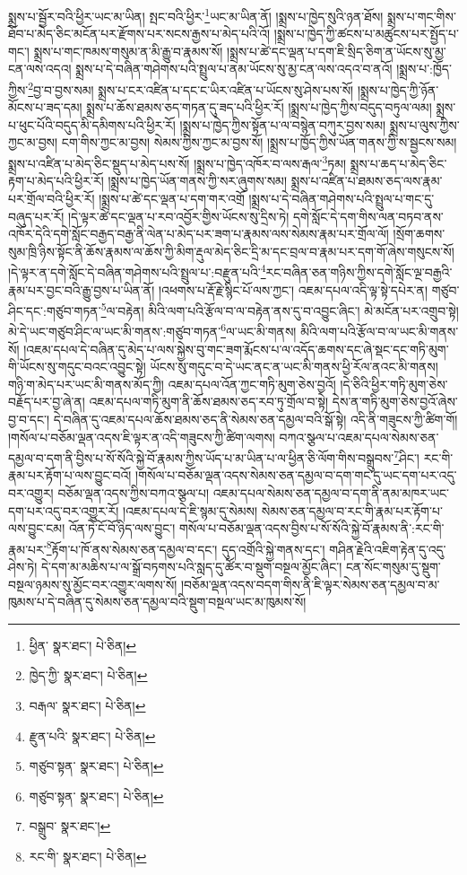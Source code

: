 སྨྲས་པ་སྦྱོར་བའི་ཕྱིར་ཡང་མ་ཡིན། སྤང་བའི་ཕྱིར་\footnote{ཕྱིན་  སྣར་ཐང་།  པེ་ཅིན། }ཡང་མ་ཡིན་ནོ། །སྨྲས་པ་ཁྱེད་སུའི་ཉན་ཐོས། སྨྲས་པ་གང་གིས་ཐོབ་པ་མེད་ཅིང་མངོན་པར་རྫོགས་པར་སངས་རྒྱས་པ་མེད་པའི་འོ། །སྨྲས་པ་ཁྱེད་ཀྱི་ཚངས་པ་མཚུངས་པར་སྤྱོད་པ་གང་། སྨྲས་པ་གང་ཁམས་གསུམ་ན་མི་རྒྱུ་བ་རྣམས་སོ། །སྨྲས་པ་ཚེ་དང་ལྡན་པ་དག་ཇི་སྲིད་ཅིག་ན་ཡོངས་སུ་མྱ་ངན་ལས་འདའ། སྨྲས་པ་དེ་བཞིན་གཤེགས་པའི་སྤྲུལ་པ་ནམ་ཡོངས་སུ་མྱ་ངན་ལས་འདའ་བ་ནའོ། །སྨྲས་པ་:ཁྱོད་ཀྱིས་\footnote{ཁྱེད་ཀྱི་  སྣར་ཐང་།  པེ་ཅིན། }བྱ་བ་བྱས་སམ། སྨྲས་པ་ངར་འཛིན་པ་དང་ང་ཡིར་འཛིན་པ་ཡོངས་སུ་ཤེས་པས་སོ། །སྨྲས་པ་ཁྱེད་ཀྱི་ཉོན་མོངས་པ་ཟད་དམ། སྨྲས་པ་ཆོས་ཐམས་ཅད་གཏན་དུ་ཟད་པའི་ཕྱིར་རོ། །སྨྲས་པ་ཁྱེད་ཀྱིས་བདུད་བཏུལ་ལམ། སྨྲས་པ་ཕུང་པོའི་བདུད་མི་དམིགས་པའི་ཕྱིར་རོ། །སྨྲས་པ་ཁྱེད་ཀྱིས་སྟོན་པ་ལ་བསྙེན་བཀུར་བྱས་སམ། སྨྲས་པ་ལུས་ཀྱིས་ཀྱང་མ་བྱས། ངག་གིས་ཀྱང་མ་བྱས། སེམས་ཀྱིས་ཀྱང་མ་བྱས་སོ། །སྨྲས་པ་ཁྱོད་ཀྱིས་ཡོན་གནས་ཀྱི་ས་སྦྱངས་སམ། སྨྲས་པ་འཛིན་པ་མེད་ཅིང་སྡུད་པ་མེད་པས་སོ། །སྨྲས་པ་ཁྱེད་འཁོར་བ་ལས་རྒལ་\footnote{བརྒལ་  སྣར་ཐང་།  པེ་ཅིན། }ཏམ། སྨྲས་པ་ཆད་པ་མེད་ཅིང་རྟག་པ་མེད་པའི་ཕྱིར་རོ། །སྨྲས་པ་ཁྱེད་ཡོན་གནས་ཀྱི་སར་ཞུགས་སམ། སྨྲས་པ་འཛིན་པ་ཐམས་ཅད་ལས་རྣམ་པར་གྲོལ་བའི་ཕྱིར་རོ། །སྨྲས་པ་ཚེ་དང་ལྡན་པ་དག་གར་འགྲོ །སྨྲས་པ་དེ་བཞིན་གཤེགས་པའི་སྤྲུལ་པ་གང་དུ་བཞུད་པར་རོ། །དེ་ལྟར་ཚེ་དང་ལྡན་པ་རབ་འབྱོར་གྱིས་ཡོངས་སུ་དྲིས་ཏེ། དགེ་སློང་དེ་དག་གིས་ལན་བཏབ་ནས་འཁོར་དེའི་དགེ་སློང་བརྒྱད་བརྒྱ་ནི་ལེན་པ་མེད་པར་ཟག་པ་རྣམས་ལས་སེམས་རྣམ་པར་གྲོལ་ལོ། །སྲོག་ཆགས་སུམ་ཁྲི་ཉིས་སྟོང་ནི་ཆོས་རྣམས་ལ་ཆོས་ཀྱི་མིག་རྡུལ་མེད་ཅིང་དྲི་མ་དང་བྲལ་བ་རྣམ་པར་དག་གོ་ཞེས་གསུངས་སོ། །དེ་ལྟར་ན་དགེ་སློང་དེ་བཞིན་གཤེགས་པའི་སྤྲུལ་པ་:བརྫུན་པའི་\footnote{རྫུན་པའི་  སྣར་ཐང་།  པེ་ཅིན། }རང་བཞིན་ཅན་གཉིས་ཀྱིས་དགེ་སློང་ལྔ་བརྒྱའི་རྣམ་པར་བྱང་བའི་རྒྱུ་བྱས་པ་ཡིན་ནོ། །འཕགས་པ་རྡོ་རྗེ་སྙིང་པོ་ལས་ཀྱང་། འཇམ་དཔལ་འདི་ལྟ་སྟེ་དཔེར་ན། གཙུབ་ཤིང་དང་:གཙུབ་གཏན་\footnote{གཙུབ་སྟན་  སྣར་ཐང་།  པེ་ཅིན། }ལ་བརྟེན། མིའི་ལག་པའི་རྩོལ་བ་ལ་བརྟེན་ནས་དུ་བ་འབྱུང་ཞིང་། མེ་མངོན་པར་འགྲུབ་སྟེ། མེ་དེ་ཡང་གཙུབ་ཤིང་ལ་ཡང་མི་གནས་:གཙུབ་གཏན་\footnote{གཙུབ་སྟན་  སྣར་ཐང་།  པེ་ཅིན། }ལ་ཡང་མི་གནས། མིའི་ལག་པའི་རྩོལ་བ་ལ་ཡང་མི་གནས་སོ། །འཇམ་དཔལ་དེ་བཞིན་དུ་མེད་པ་ལས་སྐྱེས་བུ་གང་ཟག་རྨོངས་པ་ལ་འདོད་ཆགས་དང་ཞེ་སྡང་དང་གཏི་མུག་གི་ཡོངས་སུ་གདུང་བའང་འབྱུང་སྟེ། ཡོངས་སུ་གདུང་བ་དེ་ཡང་ནང་ན་ཡང་མི་གནས་ཕྱི་རོལ་ནའང་མི་གནས། གཉི་ག་མེད་པར་ཡང་མི་གནས་མོད་ཀྱི། འཇམ་དཔལ་འོན་ཀྱང་གཏི་མུག་ཅེས་བྱའོ། །དེ་ཅིའི་ཕྱིར་གཏི་མུག་ཅེས་བརྗོད་པར་བྱ་ཞེ་ན། འཇམ་དཔལ་གཏི་མུག་ནི་ཆོས་ཐམས་ཅད་རབ་ཏུ་གྲོལ་བ་སྟེ། དེས་ན་གཏི་མུག་ཅེས་བྱའོ་ཞེས་བྱ་བ་དང་། དེ་བཞིན་དུ་འཇམ་དཔལ་ཆོས་ཐམས་ཅད་ནི་སེམས་ཅན་དམྱལ་བའི་སྒོ་སྟེ། འདི་ནི་གཟུངས་ཀྱི་ཚིག་གོ། །གསོལ་པ་བཅོམ་ལྡན་འདས་ཇི་ལྟར་ན་འདི་གཟུངས་ཀྱི་ཚིག་ལགས། བཀའ་སྩལ་པ་འཇམ་དཔལ་སེམས་ཅན་དམྱལ་བ་དག་ནི་བྱིས་པ་སོ་སོའི་སྐྱེ་བོ་རྣམས་ཀྱིས་ཡོད་པ་མ་ཡིན་པ་ལ་ཕྱིན་ཅི་ལོག་གིས་བསྒྲུབས་\footnote{བསྒྲུབ་  སྣར་ཐང་། }ཤིང་། རང་གི་རྣམ་པར་རྟོག་པ་ལས་བྱུང་བའོ། །གསོལ་པ་བཅོམ་ལྡན་འདས་སེམས་ཅན་དམྱལ་བ་དག་གང་དུ་ཡང་དག་པར་འདུ་བར་འགྱུར། བཅོམ་ལྡན་འདས་ཀྱིས་བཀའ་སྩལ་པ། འཇམ་དཔལ་སེམས་ཅན་དམྱལ་བ་དག་ནི་ནམ་མཁར་ཡང་དག་པར་འདུ་བར་འགྱུར་རོ། །འཇམ་དཔལ་དེ་ཇི་སྙམ་དུ་སེམས། སེམས་ཅན་དམྱལ་བ་རང་གི་རྣམ་པར་རྟོག་པ་ལས་བྱུང་ངམ། འོན་ཏེ་ངོ་བོ་ཉིད་ལས་བྱུང་། གསོལ་པ་བཅོམ་ལྡན་འདས་བྱིས་པ་སོ་སོའི་སྐྱེ་བོ་རྣམས་ནི་:རང་གི་རྣམ་པར་\footnote{རང་གི་  སྣར་ཐང་།  པེ་ཅིན། }རྟོག་པ་ཁོ་ནས་སེམས་ཅན་དམྱལ་བ་དང་། དུད་འགྲོའི་སྐྱེ་གནས་དང་། གཤིན་རྗེའི་འཇིག་རྟེན་དུ་འདུ་ཤེས་ཏེ། དེ་དག་མ་མཆིས་པ་ལ་སྒྲོ་བཏགས་པའི་སླད་དུ་ཚོར་བ་སྡུག་བསྔལ་མྱོང་ཞིང་། ངན་སོང་གསུམ་དུ་སྡུག་བསྔལ་ཉམས་སུ་མྱོང་བར་འགྱུར་ལགས་སོ། །བཅོམ་ལྡན་འདས་བདག་གིས་ནི་ཇི་ལྟར་སེམས་ཅན་དམྱལ་བ་མ་ཁུམས་པ་དེ་བཞིན་དུ་སེམས་ཅན་དམྱལ་བའི་སྡུག་བསྔལ་ཡང་མ་ཁུམས་སོ། 